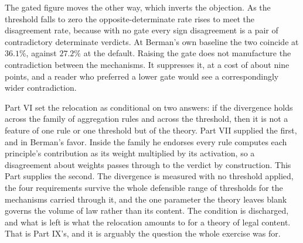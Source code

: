 The gated figure moves the other way, which inverts the objection. As the
threshold falls to zero the opposite-determinate rate rises to meet the
disagreement rate, because with no gate every sign disagreement is a pair
of contradictory determinate verdicts. At Berman's own baseline the two
coincide at $36.1\%$, against $27.2\%$ at the default. Raising the gate
does not manufacture the contradiction between the mechanisms. It suppresses it, at a cost of about nine points, and a reader who
preferred a lower gate would see a correspondingly wider contradiction.

Part VI set the relocation as conditional on two answers: if the
divergence holds across the family of aggregation rules and across the
threshold, then it is not a feature of one rule or one threshold but of the
theory. Part VII supplied the first, and in Berman's favor. Inside the family he endorses every rule computes each principle's
contribution as its weight multiplied by its activation, so a disagreement
about weights passes through to the verdict by construction. This Part supplies the
second. The divergence is measured with no threshold applied, the four
requirements survive the whole defensible range of thresholds for the
mechanisms carried through it, and the one parameter the theory leaves
blank governs the volume of law rather than its content. The condition is
discharged, and what is left is what the relocation amounts to for a
theory of legal content. That is Part IX's, and it is arguably the question the whole exercise was
for.
